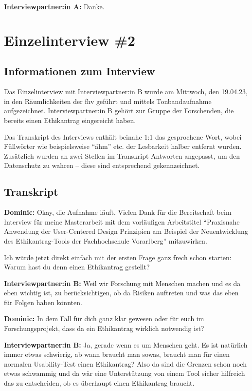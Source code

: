 \documentclass[a4paper,12pt,twoside]{scrreprt}
\begin{document}
\textbf{Interviewpartner:in A:} Danke.

\chapter{Einzelinterview \#2}
\label{appendix:interview-2}

\section{Informationen zum Interview}
\label{appendix:interview-2-infos}

Das Einzelinterview mit Interviewpartner:in B wurde am Mittwoch, den 19.04.23, in den Räumlichkeiten der \ac{fhv} geführt und mittels Tonbandaufnahme aufgezeichnet. Interviewpartner:in B gehört zur Gruppe der Forschenden, die bereits einen Ethikantrag eingereicht haben.

Das Transkript des Interviews enthält beinahe 1:1 das gesprochene Wort, wobei Füllwörter wie beispielsweise \enquote{ähm} etc. der Lesbarkeit halber entfernt wurden. Zusätzlich wurden an zwei Stellen im Transkript Antworten angepasst, um den Datenschutz zu wahren -- diese sind entsprechend gekennzeichnet.

\section{Transkript}
\label{appendix:interview-2-transkript}

\textbf{Dominic:} Okay, die Aufnahme läuft. Vielen Dank für die Bereitschaft beim Interview für meine Masterarbeit mit dem vorläufigen Arbeitstitel \enquote{Praxisnahe Anwendung der User-Centered Design Prinzipien am Beispiel der Neuentwicklung des Ethikantrag-Tools der Fachhochschule Vorarlberg} mitzuwirken.

Ich würde jetzt direkt einfach mit der ersten Frage ganz frech schon starten: Warum hast du denn einen Ethikantrag gestellt?

\textbf{Interviewpartner:in B:} Weil wir Forschung mit Menschen machen und es da eben wichtig ist, zu berücksichtigen, ob da Risiken auftreten und was das eben für Folgen haben könnten.

\textbf{Dominic:} In dem Fall für dich ganz klar gewesen oder für euch im Forschungsprojekt, dass da ein Ethikantrag wirklich notwendig ist?

\textbf{Interviewpartner:in B:} Ja, gerade wenn es um Menschen geht. Es ist natürlich immer etwas schwierig, ab wann braucht man sowas, braucht man für einen normalen Usability-Test einen Ethikantrag? Also da sind die Grenzen schon noch etwas schwammig und da wär eine Unterstützung von einem Tool sicher hilfreich das zu entscheiden, ob es überhaupt einen Ethikantrag braucht.
\end{document}
